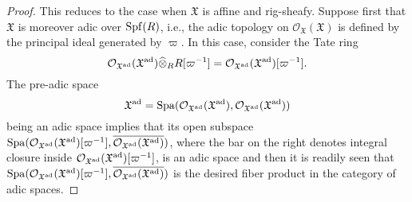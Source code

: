\documentclass[12pt,twoside,a4paper]{article}
\theoremstyle{definition}
\theoremstyle{remark}
\newcommand\ad{{\rm ad}}
\newcommand\Spa{{\rm Spa}}
\newcommand\Spf{{\rm Spf}}
\begin{document}
\begin{proof}This reduces to the case when $\mathfrak{X}$ is affine and rig-sheafy. Suppose first that $\mathfrak{X}$ is moreover adic over $\Spf(R)$, i.e., the adic topology on $\mathcal{O}_{\mathfrak{X}}(\mathfrak{X})$ is defined by the principal ideal generated by $\varpi$. In this case, consider the Tate ring\begin{equation*}\mathcal{O}_{\mathfrak{X}^{\ad}}(\mathfrak{X}^{\ad})\widehat{\otimes}_{R}R[\varpi^{-1}]=\mathcal{O}_{\mathfrak{X}^{\ad}}(\mathfrak{X}^{\ad})[\varpi^{-1}].\end{equation*}The pre-adic space\begin{equation*}\mathfrak{X}^{\ad}=\Spa(\mathcal{O}_{\mathfrak{X}^{\ad}}(\mathfrak{X}^{\ad}), \mathcal{O}_{\mathfrak{X}^{\ad}}(\mathfrak{X}^{\ad}))\end{equation*}being an adic space implies that its open subspace $\Spa(\mathcal{O}_{\mathfrak{X}^{\ad}}(\mathfrak{X}^{\ad})[\varpi^{-1}], \overline{\mathcal{O}_{\mathfrak{X}^{\ad}}(\mathfrak{X}^{\ad})})$, where the bar on the right denotes integral closure inside $\mathcal{O}_{\mathfrak{X}^{\ad}}(\mathfrak{X}^{\ad})[\varpi^{-1}]$, is an adic space and then it is readily seen that $\Spa(\mathcal{O}_{\mathfrak{X}^{\ad}}(\mathfrak{X}^{\ad})[\varpi^{-1}], \overline{\mathcal{O}_{\mathfrak{X}^{\ad}}(\mathfrak{X}^{\ad})})$ is the desired fiber product in the category of adic spaces.


\end{proof}
\end{document}

